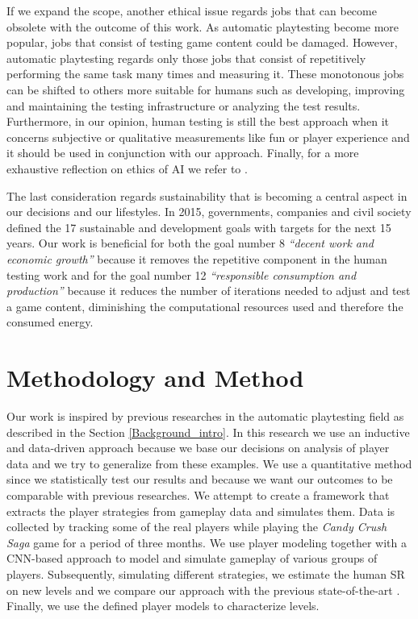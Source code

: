 If we expand the scope, another ethical issue regards jobs that can become obsolete with the outcome of this work. As automatic playtesting become more popular, jobs that consist of testing game content could be damaged. However, automatic playtesting regards only those jobs that consist of repetitively performing the same task many times and measuring it. These monotonous jobs can be shifted to others more suitable for humans such as developing, improving and maintaining the testing infrastructure or analyzing the test results. Furthermore, in our opinion, human testing is still the best approach when it concerns subjective or qualitative measurements like fun or player experience and it should be used in conjunction with our approach. Finally, for a more exhaustive reflection on ethics of \acs{AI} we refer to \textcite{bostrom_ethics_2014}.

The last consideration regards sustainability that is becoming a central aspect in our decisions and  our lifestyles. In 2015, governments, companies and civil society defined the 17 sustainable and development goals with targets for the next 15 years. Our work is beneficial for both the goal number 8 \textit{“decent work and economic growth”} because it removes the repetitive component in the human testing work and for the goal number 12 \textit{“responsible consumption and production”} because it reduces the number of iterations needed to adjust and test a game content, diminishing the computational resources used and therefore the consumed energy.

\section{Methodology and Method}
Our work is inspired by previous researches in the automatic playtesting field as described in the Section \ref{Background_intro}. In this research we use an inductive \cite{kumar_selecting_2011} and data-driven approach because we base our decisions on analysis of player data and we try to generalize from these examples. We use a quantitative method \cite{creswell_research_2018} since we statistically test our results and because we want our outcomes to be comparable with previous researches. We attempt to create a framework that extracts the player strategies from gameplay data and simulates them. Data is collected by tracking some of the real players while playing the \textit{Candy Crush Saga} game for a period of three months. We use player modeling together with a \acs{CNN}-based approach to model and simulate gameplay of various groups of players. Subsequently, simulating different strategies, we estimate the human SR on new levels and we compare our approach with the previous state-of-the-art \cite{eisen_simulating_2017}. Finally, we use the defined player models to characterize levels. 

